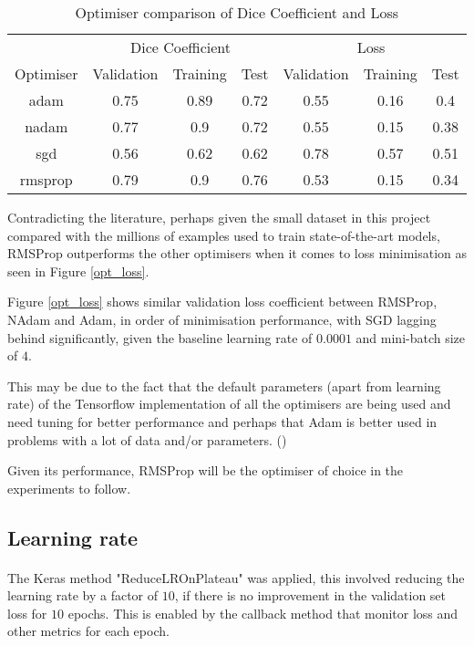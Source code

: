 \begin{table}[ht!] 
    \begin{center}
    \begin{tabular}{ccccccc} 
    \toprule
       & \multicolumn{3}{c}{Dice Coefficient}     & \multicolumn{3}{c}{Loss} \\
    Optimiser & Validation & Training & Test & Validation    & Training    & Test   \\ \midrule

    adam & 0.75 & 0.89 & 0.72 & 0.55 & 0.16 & 0.4  \\ nadam & 0.77 & 0.9 & 0.72 & 0.55 & 0.15 & 0.38  \\ sgd & 0.56 & 0.62 & 0.62 & 0.78 & 0.57 & 0.51  \\ \rowcolor{lightgray} rmsprop & 0.79 & 0.9 & 0.76 & 0.53 & 0.15 & 0.34  \\ 
    
    \bottomrule
    \end{tabular}
  \end{center} 
  \caption{Optimiser comparison of Dice Coefficient and Loss}\label{tab_opt}
\end{table}

Contradicting the literature, perhaps given the small dataset in this project compared with the millions of examples used to train state-of-the-art models, \gls{RMSProp} outperforms the other optimisers when it comes to loss minimisation as seen in Figure \ref{opt_loss}.

Figure \ref{opt_loss} shows similar validation loss coefficient between \gls{RMSProp}, \gls{NAdam} and \gls{Adam}, in order of minimisation performance, with \gls{SGD} lagging behind significantly, given the baseline learning rate of $0.0001$ and mini-batch size of $4$.

This may be due to the fact that the default parameters (apart from learning rate) of the Tensorflow implementation of all the optimisers are being used and need tuning for better performance and perhaps that \gls{Adam} is better used in problems with a lot of data and/or parameters. (\cite{kingma2017adam}) 

Given its performance, \gls{RMSProp} will be the optimiser of choice in the experiments to follow.
\subsection{Learning rate}
\paragraph{}
The Keras method "ReduceLROnPlateau" was applied, this involved reducing the learning rate by a factor of $10$, if there is no improvement in the validation set loss for $10$ epochs. This is enabled by the callback method that monitor loss and other metrics for each epoch.

